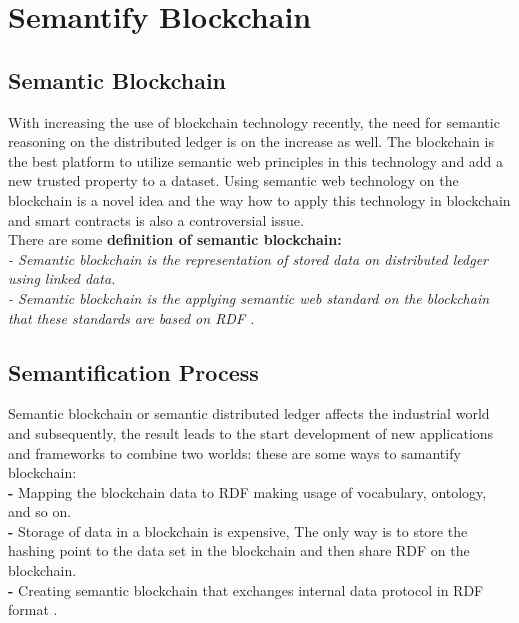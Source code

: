 \section{Semantify Blockchain}
\subsection{Semantic Blockchain}
With increasing the use of blockchain technology recently, the need for semantic reasoning on the distributed ledger is on the increase as well. The blockchain is the best platform to utilize semantic web principles in this technology and add a new trusted property to a dataset. 
Using semantic web technology on the blockchain is a novel idea and the way how to apply this technology in blockchain and smart contracts is also a controversial issue.\\
There are some \textbf{definition of semantic blockchain:}\\ 
\textit{- Semantic blockchain is the representation of stored data on distributed ledger using linked data. }\\
\textit{- Semantic blockchain is the applying semantic web standard on the blockchain that these standards are based on RDF \cite{Hector}.}

\subsection{Semantification Process}
Semantic blockchain or semantic distributed ledger affects the industrial world and subsequently, the result leads to the start development of new applications and frameworks to combine two worlds:
these are some ways to samantify blockchain:\\
\textbf{-} Mapping the blockchain data to RDF making usage of vocabulary, ontology, and so on.\\
\textbf{-} Storage of data in a blockchain is expensive, The only way is to store the hashing point to the data set in the blockchain and then share RDF on the blockchain. \\
\textbf{-} Creating semantic blockchain that exchanges internal data protocol in RDF format \cite{Hector}. \\

